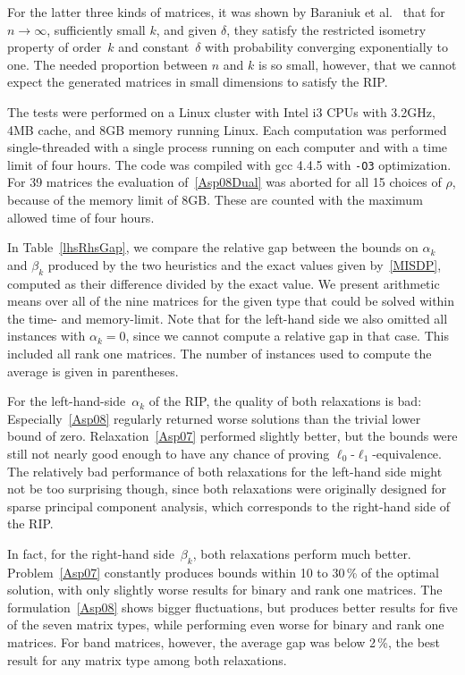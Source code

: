 \documentclass[journal]{IEEEtran}
\begin{document}
For the latter three kinds of matrices, it was shown by Baraniuk et al.~\cite{BDDW08} that for $n \rightarrow \infty$, 
sufficiently small $k$, and given $\delta$, they satisfy the restricted
isometry property of order~$k$ and constant~$\delta$
with probability converging exponentially to one. The needed proportion between $n$ and $k$ is so small, however,
that we cannot expect the generated matrices in small dimensions to satisfy the RIP.

The tests were performed on a Linux cluster with Intel i3 CPUs with 3.2GHz, 4MB cache, and 8GB memory running
Linux. Each computation was performed single-threaded with a single process running on each computer and with 
a time limit of four hours. The code was compiled with gcc 4.4.5 with \texttt{-O3} optimization. For 39 matrices 
the evaluation of~\eqref{Asp08Dual} was aborted for all 15 choices of $\rho$, because of the memory limit of 8GB. 
These are counted with the maximum allowed time of four hours. 

In Table~\ref{lhsRhsGap}, we compare the relative gap between the bounds on $\alpha_k$ and $\beta_k$ produced by the two heuristics
and the exact values given by~\eqref{MISDP}, computed as their difference divided by the exact value. We present arithmetic means over all of the nine matrices for the given type that
could be solved within the time- and memory-limit. Note that for the left-hand side we also omitted all instances with $\alpha_k=0$, 
since we cannot compute a relative gap in that case. This included all rank one matrices. The number of instances used to compute the
average is given in parentheses.

For the left-hand-side~$\alpha_k$ of the RIP, the quality of both
relaxations is bad: Especially~\eqref{Asp08} regularly returned worse solutions than the
trivial lower bound of zero. Relaxation~\eqref{Asp07} performed slightly better, but the bounds
were still not nearly good enough to have any chance of proving $\ell_0$-$\ell_1$-equivalence. The relatively
bad performance of both relaxations for the left-hand side might not be too surprising though, since both relaxations
were originally designed for sparse principal component analysis, which corresponds to the right-hand side
of the RIP.



In fact, for the right-hand side~$\beta_k$,  both relaxations
perform much better. Problem~\eqref{Asp07} constantly produces bounds within 10 to 30\,\% of the optimal
solution, with only slightly worse results for binary and rank one matrices. The formulation~\eqref{Asp08}
shows bigger fluctuations, but produces better results for five of the seven matrix types, while performing even
worse for binary and rank one matrices. For band matrices, however, the average gap was below 2\,\%, the best 
result for any matrix type among both relaxations.
\end{document}
